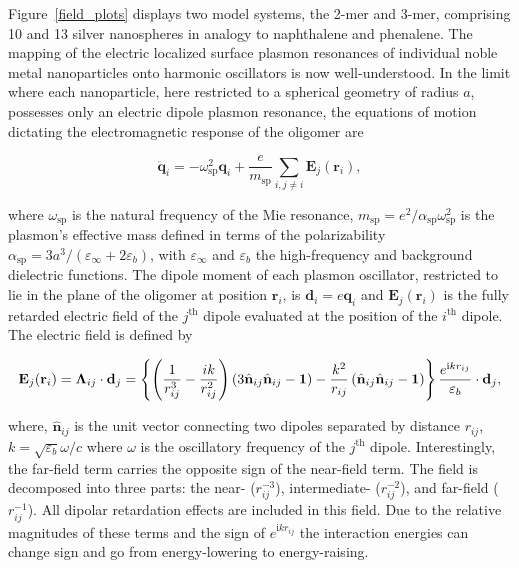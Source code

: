 \documentclass[journal=apchd5,manuscript=article]{achemso}
\begin{document}
Figure~\ref{field_plots} displays two model systems, the 2-mer and 3-mer, comprising 10 and 13 silver nanospheres in analogy to naphthalene and phenalene. The mapping of the electric localized surface plasmon resonances of individual noble metal nanoparticles onto harmonic oscillators is now well-understood\cite{ARPC}. In the limit where each nanoparticle, here restricted to a spherical geometry of radius $a$, possesses only an electric dipole plasmon resonance, the equations of motion dictating the electromagnetic response of the oligomer are

\begin{equation}
\ddot{\textbf{q}}_i = -\omega_{\textrm{sp}}^2\textbf{q}_i + \frac{e}{m_{\textrm{sp}}}\sum_{i,j\neq i}\textbf{E}_j(\textbf{r}_i),
\label{equation_of_motion}
\end{equation}

\noindent where $\omega_{\textrm{sp}}$ is the natural frequency of the Mie resonance, $m_{\textrm{sp}} = e^2/\alpha_{\textrm{sp}}\omega_{\textrm{sp}}^2$ is the plasmon's effective mass defined in terms of the polarizability $\alpha_{\textrm{sp}} = 3a^3/(\varepsilon_{\infty} + 2\varepsilon_b)$, with $\varepsilon_{\infty}$ and $\varepsilon_b$ the high-frequency and background dielectric functions. The dipole moment of each plasmon oscillator, restricted to lie in the plane of the oligomer at position $\textbf{r}_i$, is $\textbf{d}_i = e\textbf{q}_i$ and $\textbf{E}_j(\textbf{r}_i)$ is the fully retarded electric field of the $j^{\textrm{th}}$ dipole evaluated at the position of the $i^{\textrm{th}}$ dipole. The electric field is defined by

\begin{equation}
\textbf{E}_j(\textbf{r}_i) = \boldsymbol{\Lambda}_{ij}\cdot\textbf{d}_j\\
= \left\{\left(\frac{1}{r_{ij}^3} - \frac{ik}{r_{ij}^2}\right)\left(3\hat{\textbf{n}}_{ij}\hat{\textbf{n}}_{ij} - \textbf{1}\right) - \frac{k^2}{r_{ij}}\left(\hat{\textbf{n}}_{ij}\hat{\textbf{n}}_{ij} - \textbf{1}\right)\right\}\frac{e^{\textrm{i}kr_{ij}}}{\varepsilon_b}\cdot\textbf{d}_j,
\label{electric_field_lambda}
\end{equation}

\noindent where, $\hat{\textbf{n}}_{ij}$ is the unit vector connecting two dipoles separated by distance $r_{ij}$, $k=\sqrt{\varepsilon_b}\omega/c$ where $\omega$ is the oscillatory frequency of the $j^{\textrm{th}}$ dipole. Interestingly, the far-field term carries the opposite sign of the near-field term. The field is decomposed into three parts: the near- ($r_{ij}^{-3}$), intermediate- ($r_{ij}^{-2}$), and far-field ($r_{ij}^{-1}$). All dipolar retardation effects are included in this field\cite{Purcell1973}. Due to the relative magnitudes of these terms and the sign of $e^{\textrm{i}kr_{ij}}$ the interaction energies can change sign and go from energy-lowering to energy-raising.
\end{document}

